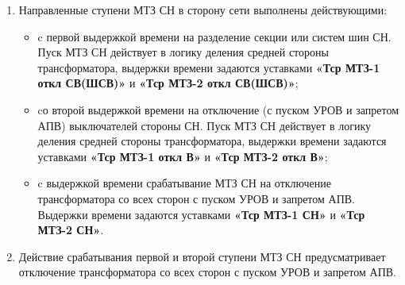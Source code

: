 \begin{enumerate}[label=\arabic{section}.\arabic{subsection}.\arabic*,  align=left, labelsep=4pt, leftmargin=0pt, itemindent=57pt]
\item
Направленные ступени МТЗ СН в сторону сети выполнены действующими:
\begin{itemize}
\item c первой выдержкой времени на разделение секции или систем шин СН. Пуск МТЗ СН действует в логику деления средней стороны трансформатора, выдержки времени задаются уставками \textbf{«Тср МТЗ-1 откл СВ(ШСВ)»} и \textbf{«Тср МТЗ-2 откл СВ(ШСВ)»};
\item cо второй выдержкой времени на отключение (с пуском УРОВ и запретом АПВ) выключателей стороны СН. Пуск МТЗ СН действует в логику деления средней стороны трансформатора, выдержки времени задаются уставками \textbf{«Тср МТЗ-1 откл В»} и \textbf{«Тср МТЗ-2 откл В»};
\item c выдержкой времени срабатывание МТЗ СН на отключение трансформатора со всех сторон с пуском УРОВ и запретом АПВ. Выдержки времени задаются уставками \textbf{«Тср МТЗ-1 СН»} и \textbf{«Тср МТЗ-2 СН»}.
\end{itemize}

\item
Действие срабатывания первой и второй ступени МТЗ СН предусматривает отключение трансформатора со всех сторон с пуском УРОВ и запретом АПВ. 

\end{enumerate} 